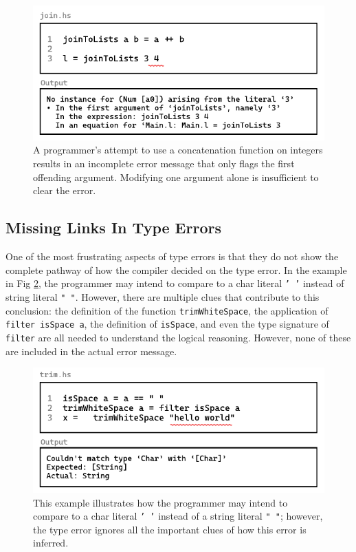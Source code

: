\begin{figure}[hbt]
  \includegraphics[width=\linewidth]{TypeErrorExample2}
  \caption{
    \label{fig:type-error-example-2}
    A programmer’s attempt to use a concatenation function on integers results in an incomplete error message that only flags the first offending argument. Modifying one argument alone is insufficient to clear the error.
    }
\end{figure}

\subsection{Missing Links In Type Errors}
\label{subsec:missing-link}

One of the most frustrating aspects of type errors is that they do not show the complete pathway of how the compiler decided on the type error. In the example in Fig \ref{fig:type-error-example-3}, the programmer may intend to compare to a char literal \texttt{' '} instead of string literal \texttt{" "}. However, there are multiple clues that contribute to this conclusion: the definition of the function \texttt{trimWhiteSpace}, the application of \texttt{filter isSpace a}, the definition of \texttt{isSpace}, and even the type signature of \texttt{filter} are all needed to understand the logical reasoning. However, none of these are included in the actual error message.


\begin{figure}[hbt]
  \includegraphics[width=\linewidth]{TypeErrorExample3}
  \caption{
    \label{fig:type-error-example-3}
  This example illustrates how the programmer may intend to compare to a char literal \texttt{' '} instead of a string literal \texttt{" "}; however, the type error ignores all the important clues of how this error is inferred. 
    }
\end{figure}



